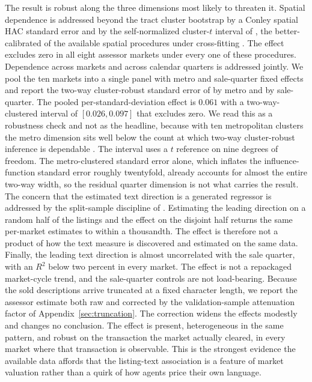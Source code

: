 The result is robust along the three dimensions most likely to threaten it.
Spatial dependence is addressed beyond the tract cluster bootstrap by a Conley spatial HAC standard error and by the self-normalized cluster-$t$ interval of \citet{ibragimov2010t}, the better-calibrated of the available spatial procedures under cross-fitting \citep{salerno2026spatially}. The effect excludes zero in all eight assessor markets under every one of these procedures.
Dependence across markets and across calendar quarters is addressed jointly. We pool the ten markets into a single panel with metro and sale-quarter fixed effects and report the two-way cluster-robust standard error of \citet{cameron2011robust} by metro and by sale-quarter. The pooled per-standard-deviation effect is $0.061$ with a two-way-clustered interval of $[0.026, 0.097]$ that excludes zero. We read this as a robustness check and not as the headline, because with ten metropolitan clusters the metro dimension sits well below the count at which two-way cluster-robust inference is dependable \citep{cameron2015practitioner}. The interval uses a $t$ reference on nine degrees of freedom. The metro-clustered standard error alone, which inflates the influence-function standard error roughly twentyfold, already accounts for almost the entire two-way width, so the residual quarter dimension is not what carries the result. The concern that the estimated text direction is a generated regressor is addressed by the split-sample discipline of \citet{egami2022texts}. Estimating the leading direction on a random half of the listings and the effect on the disjoint half returns the same per-market estimates to within a thousandth. The effect is therefore not a product of how the text measure is discovered and estimated on the same data.
Finally, the leading text direction is almost uncorrelated with the sale quarter, with an $R^2$ below two percent in every market. The effect is not a repackaged market-cycle trend, and the sale-quarter controls are not load-bearing. Because the sold descriptions arrive truncated at a fixed character length, we report the assessor estimate both raw and corrected by the validation-sample attenuation factor of Appendix~\ref{sec:truncation}. The correction widens the effects modestly and changes no conclusion. The effect is present, heterogeneous in the same pattern, and robust on the transaction the market actually cleared, in every market where that transaction is observable. This is the strongest evidence the available data affords that the listing-text association is a feature of market valuation rather than a quirk of how agents price their own language.




